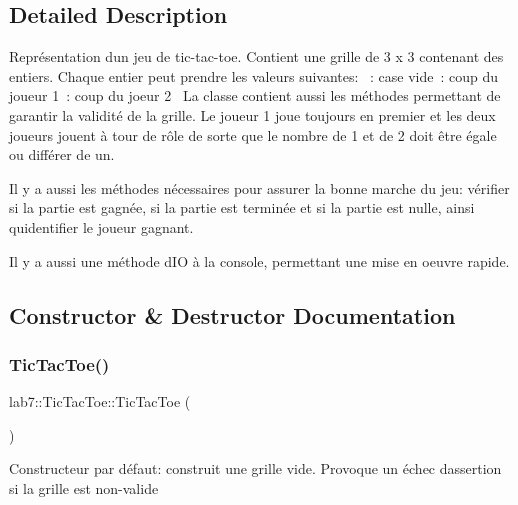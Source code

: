 \subsection{Detailed Description}
Représentation d\textquotesingle{}un jeu de tic-\/tac-\/toe. Contient une grille de 3 x 3 contenant des entiers. Chaque entier peut prendre les valeurs suivantes\+: ~\+: case vide~\+: coup du joueur 1~\+: coup du joeur 2~\newline
 La classe contient aussi les méthodes permettant de garantir la validité de la grille. Le joueur 1 joue toujours en premier et les deux joueurs jouent à tour de rôle de sorte que le nombre de 1 et de 2 doit être égale ou différer de un.

Il y a aussi les méthodes nécessaires pour assurer la bonne marche du jeu\+: vérifier si la partie est gagnée, si la partie est terminée et si la partie est nulle, ainsi qu\textquotesingle{}identifier le joueur gagnant.

Il y a aussi une méthode d\textquotesingle{}IO à la console, permettant une mise en oeuvre rapide. 

\subsection{Constructor \& Destructor Documentation}
\mbox{\label{classlab7_1_1TicTacToe_aaaee62ac2cc9f9073795ecb3019764f4}} 
\subsubsection{\texorpdfstring{Tic\+Tac\+Toe()}{TicTacToe()}\hspace{0.1cm}{\footnotesize\ttfamily [1/2]}}
{\footnotesize\ttfamily lab7\+::\+Tic\+Tac\+Toe\+::\+Tic\+Tac\+Toe (\begin{DoxyParamCaption}{ }\end{DoxyParamCaption})}

Constructeur par défaut\+: construit une grille vide. Provoque un échec d\textquotesingle{}assertion si la grille est non-\/valide \mbox{\label{classlab7_1_1TicTacToe_a192d59b62d1c9a457362125183747604}} 
